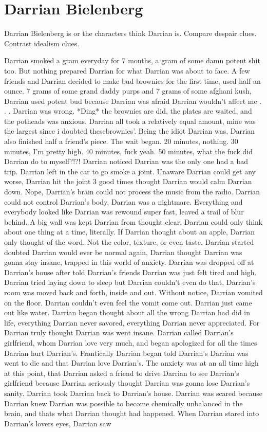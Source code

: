 \documentclass[12pt]{book}
\begin{document}
\chapter{Darrian Bielenberg}

Darrian Bielenberg is  or the characters think Darrian is. Compare despair clues. Contrast idealism clues.



Darrian smoked a gram everyday for 7 months, a gram of some damn potent shit too. But nothing prepared Darrian for what Darrian was about to face. A few friends and Darrian decided to make bud brownies for the first time, used half an ounce. 7 grams of some grand daddy purps and 7 grams of some afghani kush, Darrian used potent bud because Darrian was afraid Darrian wouldn't affect me . . .  Darrian was wrong. *Ding* the brownies are did, the plates are waited, and the potheads was anxious. Darrian all took a relatively equal amount, mine was the largest since i doubted thesebrownies'. Being the idiot Darrian was, Darrian also finished half a friend's piece. The wait began. 20 minutes, nothing. 30 minutes, I'm pretty high. 40 minutes, fuck yeah. 50 minutes, what the fuck did Darrian do to myself?!?! Darrian noticed Darrian was the only one had a bad trip. Darrian left in the car to go smoke a joint. Unaware Darrian could get any worse, Darrian hit the joint 3 good times thought Darrian would calm Darrian down. Nope, Darrian's brain could not process the music from the radio. Darrian could not control Darrian's body, Darrian was a nightmare. Everything and everybody looked like Darrian was rewound super fast, leaved a trail of blur behind. A big wall was kept Darrian from thought clear, Darrian could only think about one thing at a time, literally. If Darrian thought about an apple, Darrian only thought of the word. Not the color, texture, or even taste. Darrian started doubted Darrian would ever be normal again, Darrian thought Darrian was gonna stay insane, trapped in this world of anxiety. Darrian was dropped off at Darrian's house after told Darrian's friends Darrian was just felt tired and high. Darrian tried laying down to sleep but Darrian couldn't even do that, Darrian's room was moved back and forth, inside and out. Without notice, Darrian vomited on the floor. Darrian couldn't even feel the vomit come out. Darrian just came out like water. Darrian began thought about all the wrong Darrian had did in life, everything Darrian never savored, everything Darrian never appreciated. For Darrian truly thought Darrian was went insane. Darrian called Darrian's girlfriend, whom Darrian love very much, and began apologized for all the times Darrian hurt Darrian's. Frantically Darrian began told Darrian's Darrian was went to die and that Darrian love Darrian's. The anxiety was at an all time high at this point, that Darrian asked a friend to drive Darrian to see Darrian's girlfriend because Darrian seriously thought Darrian was gonna lose Darrian's sanity. Darrian took Darrian back to Darrian's house. Darrian was scared because Darrian knew Darrian was possible to become chemically unbalanced in the brain, and thats what Darrian thought had happened. When Darrian stared into Darrian's lovers eyes, Darrian saw 
\end{document}
